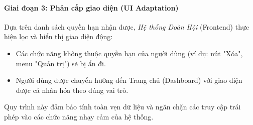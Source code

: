 \paragraph{Giai đoạn 3: Phân cấp giao diện (UI Adaptation)}
Dựa trên danh sách quyền hạn nhận được, \textit{Hệ thống Đoàn Hội} (Frontend) thực hiện lọc và hiển thị giao diện động:
\begin{itemize}
    \item Các chức năng không thuộc quyền hạn của người dùng (ví dụ: nút "Xóa", menu "Quản trị") sẽ bị ẩn đi.
    \item Người dùng được chuyển hướng đến Trang chủ (Dashboard) với giao diện được cá nhân hóa theo đúng vai trò.
\end{itemize}

Quy trình này đảm bảo tính toàn vẹn dữ liệu và ngăn chặn các truy cập trái phép vào các chức năng nhạy cảm của hệ thống.